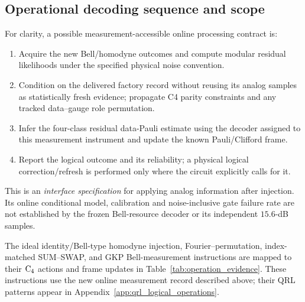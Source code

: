 \documentclass[aps,
prx,
superscriptaddress,
reprint,
longbibliography,
floatfix]{revtex4-2}
\begin{document}
\subsection{Operational decoding sequence and scope}
For clarity, a possible measurement-accessible online processing contract is:
\begin{enumerate}[label=(\roman*),leftmargin=2em,itemsep=2pt,topsep=2pt]
\item Acquire the new Bell/homodyne outcomes and compute modular residual likelihoods under the specified physical noise convention.
\item Condition on the delivered factory record without reusing its analog samples as statistically fresh evidence; propagate C4 parity constraints and any tracked data--gauge role permutation.
\item Infer the four-class residual data-Pauli estimate using the decoder assigned to this measurement instrument and update the known Pauli/Clifford frame.
\item Report the logical outcome and its reliability; a physical logical correction/refresh is performed only where the circuit explicitly calls for it.
\end{enumerate}
This is an \emph{interface specification} for applying analog information after injection. Its online conditional model, calibration and noise-inclusive gate failure rate are not established by the frozen Bell-resource decoder or its independent $15.6$-dB samples.

The ideal identity/Bell-type homodyne injection, Fourier--permutation, index-matched SUM--SWAP, and GKP Bell-measurement instructions are mapped to their ${\rm C_4}$ actions and frame updates in Table~\ref{tab:operation_evidence}. These instructions use the new online measurement record described above; their QRL patterns appear in Appendix~\ref{app:qrl_logical_operations}.
\end{document}
